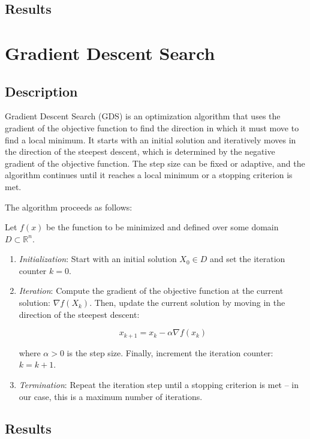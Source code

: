 \documentclass{article}
\begin{document}
\subsection{Results}

\section{Gradient Descent Search}

\subsection{Description}

Gradient Descent Search (GDS) is an optimization algorithm that uses
the gradient of the objective function to find the direction in which
it must move to find a local minimum. It starts with an initial
solution and iteratively moves in the direction of the steepest
descent, which is determined by the negative gradient of the
objective function. The step size can be fixed or adaptive, and the
algorithm continues until it reaches a local minimum or a stopping
criterion is met.

The algorithm proceeds as follows:

Let $f(x)$ be the function to be minimized and defined over some domain
$D \subset \mathbb{R}^n$.

\begin{enumerate}
  \item \textit{Initialization}: Start with an initial solution $X_0
    \in D$ and set the iteration counter $k = 0$.
  \item \textit{Iteration}: Compute the gradient of the objective
    function at the current solution: $\nabla f(X_k)$. Then, update
    the current solution by moving in the direction of the steepest
    descent:

    $$ x_{k+1} = x_k - \alpha \nabla f(x_k) $$

    where $\alpha > 0$ is the step size. Finally, increment the
    iteration counter: $k = k + 1$.
  \item \textit{Termination}: Repeat the iteration step until a
    stopping criterion is met -- in our case, this is a maximum
    number of iterations.
\end{enumerate}

\subsection{Results}
\end{document}
